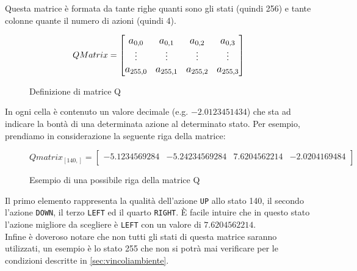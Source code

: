 Questa matrice \`{e} formata da tante righe quanti sono gli stati (quindi 256) e tante colonne quante il numero di azioni (quindi 4).

\begin{figure}[H]
	\begin{equation*}
		\large
		QMatrix =
		\begin{bmatrix}
			a_{0,0} & a_{0,1} & a_{0,2} & a_{0,3} \\
			\vdots & \vdots & \vdots & \vdots \\
			a_{255,0} & a_{255,1} & a_{255,2} & a_{255,3}
		\end{bmatrix}
	\end{equation*}
	\caption{Definizione di matrice Q}
\end{figure}

In ogni cella \`{e} contenuto un valore decimale (e.g. $-2.0123451434$) che sta ad indicare la bont\`{a} di una determinata azione al determinato stato. Per esempio, prendiamo in considerazione la seguente riga della matrice:

\begin{figure}[H]
	\begin{equation*}
		Qmatrix_{[140,]} =
		\begin{bmatrix}
			-5.1234569284 & -5.24234569284 & 7.6204562214 & -2.0204169484\\
		\end{bmatrix}
	\end{equation*}
	\caption{Esempio di una possibile riga della matrice Q}
\end{figure}

Il primo elemento rappresenta la qualit\`{a} dell'azione \lstinline[style=cmd]|UP| allo stato 140, il secondo l'azione  \lstinline[style=cmd]|DOWN|, il terzo  \lstinline[style=cmd]|LEFT| ed il quarto  \lstinline[style=cmd]|RIGHT|. \`{E} facile intuire che in questo stato l'azione migliore  da scegliere \`{e}  \lstinline[style=cmd]|LEFT| con un valore di  $7.6204562214$.\\

Infine \`{e} doveroso notare che non tutti gli stati di questa matrice saranno utilizzati, un esempio \`{e} lo stato 255 che non si potr\`{a} mai verificare per le condizioni descritte in \autoref{sec:vincoliambiente}.\\

